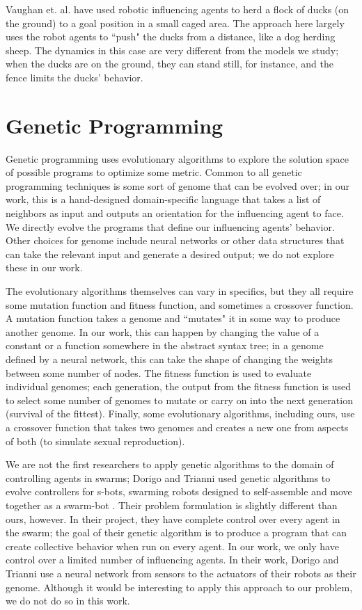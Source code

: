 Vaughan et. al. \cite{vaughan98} have used robotic influencing agents to herd
a flock of ducks (on the ground) to a goal position in a small caged area.
The approach here largely uses the robot agents to ``push" the ducks from a
distance, like a dog herding sheep.
The dynamics in this case are very different from the models we study; when the
ducks are on the ground, they can stand still, for instance, and the fence
limits the ducks' behavior.

\section{Genetic Programming}
Genetic programming \cite{kozaGP} uses evolutionary algorithms to explore the
solution space of possible programs to optimize some metric.
Common to all genetic programming techniques is some sort of genome that can be
evolved over; in our work, this is a hand-designed domain-specific language
that takes a list of neighbors as input and outputs an orientation for the
influencing agent to face.
We directly evolve the programs that define our influencing agents' behavior.
Other choices for genome include neural networks or other data structures that
can take the relevant input and generate a desired output; we do not explore
these in our work.

The evolutionary algorithms themselves can vary in specifics, but they all
require some mutation function and fitness function, and sometimes a crossover
function.
A mutation function takes a genome and ``mutates" it in some way to produce
another genome.
In our work, this can happen by changing the value of a constant or a function
somewhere in the abstract syntax tree; in a genome defined by a neural network,
this can take the shape of changing the weights between some number of nodes.
The fitness function is used to evaluate individual genomes; each generation,
the output from the fitness function is used to select some number of genomes
to mutate or carry on into the next generation (survival of the fittest).
Finally, some evolutionary algorithms, including ours, use a crossover function
that takes two genomes and creates a new one from aspects of both (to simulate
sexual reproduction).

We are not the first researchers to apply genetic algorithms to the domain
of controlling agents in swarms; Dorigo and Trianni used genetic algorithms to
evolve controllers for s-bots, swarming robots designed to self-assemble and
move together as a swarm-bot \cite{DorigoSwarmBot}.
Their problem formulation is slightly different than ours, however.
In their project, they have complete control over every agent in the swarm;
the goal of their genetic algorithm is to produce a program that can create
collective behavior when run on every agent.
In our work, we only have control over a limited number of influencing agents.
In their work, Dorigo and Trianni use a neural network from sensors to the
actuators of their robots as their genome.
Although it would be interesting to apply this approach to our problem, we do
not do so in this work.

